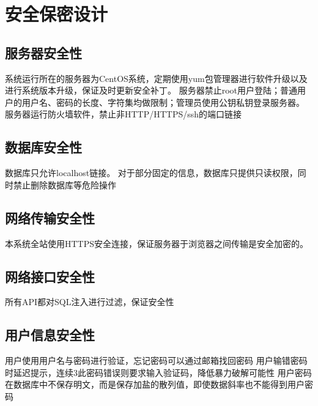 \chapter{安全保密设计}

    \section{服务器安全性}
        系统运行所在的服务器为CentOS系统，定期使用yum包管理器进行软件升级以及进行系统版本升级，保证及时更新安全补丁。
        服务器禁止root用户登陆；普通用户的用户名、密码的长度、字符集均做限制；管理员使用公钥私钥登录服务器。
        服务器运行防火墙软件，禁止非HTTP/HTTPS/ssh的端口链接
    \section{数据库安全性}
        数据库只允许localhost链接。
        对于部分固定的信息，数据库只提供只读权限，同时禁止删除数据库等危险操作
    \section{网络传输安全性}
        本系统全站使用HTTPS安全连接，保证服务器于浏览器之间传输是安全加密的。
    \section{网络接口安全性}
        所有API都对SQL注入进行过滤，保证安全性
    \section{用户信息安全性}
        用户使用用户名与密码进行验证，忘记密码可以通过邮箱找回密码
        用户输错密码时延迟提示，连续3此密码错误则要求输入验证码，降低暴力破解可能性
        用户密码在数据库中不保存明文，而是保存加盐的散列值，即使数据斜率也不能得到用户密码